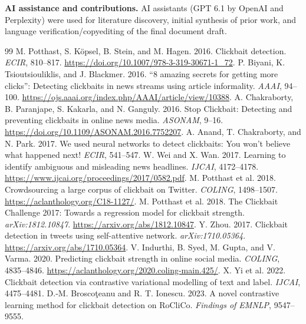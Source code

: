 \documentclass[11pt]{article}
\begin{document}
\textbf{AI assistance and contributions.} AI assistants (GPT 6.1 by OpenAI and Perplexity) were used for literature discovery, initial synthesis of prior work, and language verification/copyediting of the final document draft. 

\begin{thebibliography}{99}\small
{} M. Potthast, S. K\"opsel, B. Stein, and M. Hagen. 2016. Clickbait detection. \emph{ECIR}, 810--817. \url{https://doi.org/10.1007/978-3-319-30671-1_72}.
 P. Biyani, K. Tsioutsiouliklis, and J. Blackmer. 2016. ``8 amazing secrets for getting more clicks'': Detecting clickbaits in news streams using article informality. \emph{AAAI}, 94--100. \url{https://ojs.aaai.org/index.php/AAAI/article/view/10388}.
 A. Chakraborty, B. Paranjape, S. Kakarla, and N. Ganguly. 2016. Stop Clickbait: Detecting and preventing clickbaits in online news media. \emph{ASONAM}, 9--16. \url{https://doi.org/10.1109/ASONAM.2016.7752207}.
 A. Anand, T. Chakraborty, and N. Park. 2017. We used neural networks to detect clickbaits: You won't believe what happened next! \emph{ECIR}, 541--547.
 W. Wei and X. Wan. 2017. Learning to identify ambiguous and misleading news headlines. \emph{IJCAI}, 4172--4178. \url{https://www.ijcai.org/proceedings/2017/0582.pdf}.
 M. Potthast et al. 2018. Crowdsourcing a large corpus of clickbait on Twitter. \emph{COLING}, 1498--1507. \url{https://aclanthology.org/C18-1127/}.
 M. Potthast et al. 2018. The Clickbait Challenge 2017: Towards a regression model for clickbait strength. \emph{arXiv:1812.10847}. \url{https://arxiv.org/abs/1812.10847}.
 Y. Zhou. 2017. Clickbait detection in tweets using self-attentive network. \emph{arXiv:1710.05364}. \url{https://arxiv.org/abs/1710.05364}.
 V. Indurthi, B. Syed, M. Gupta, and V. Varma. 2020. Predicting clickbait strength in online social media. \emph{COLING}, 4835--4846. \url{https://aclanthology.org/2020.coling-main.425/}.
 X. Yi et al. 2022. Clickbait detection via contrastive variational modelling of text and label. \emph{IJCAI}, 4475--4481.
 D.-M. Brosco\c{t}eanu and R. T. Ionescu. 2023. A novel contrastive learning method for clickbait detection on RoCliCo. \emph{Findings of EMNLP}, 9547--9555.

\end{thebibliography}
\end{document}
